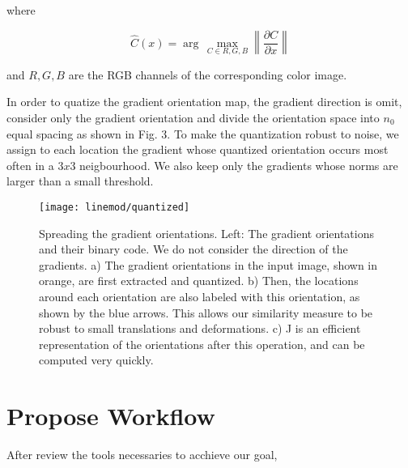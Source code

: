 where

\begin{equation}
\hat{C}(x)=\arg \, \max\limits_{C \in {R,G,B}}\left\|\frac{\partial C}{\partial x}\right\|
\end{equation}

and $R,G,B$ are the RGB channels of the corresponding color image.

In order to quatize the gradient orientation map, the gradient direction is omit,
consider only the gradient orientation and divide the orientation space into $n_0$
equal spacing as shown in Fig. 3. To make the quantization robust to 
noise, we assign to each location the gradient whose quantized orientation occurs most often in a $3 x 3$
neigbourhood. We also keep only the gradients whose norms are larger than a small
threshold.

\begin{figure}[ht]
\centering
\texttt{[image: linemod/quantized]}
\caption{Spreading the gradient orientations. Left: The gradient orientations and their binary code. We do not consider the direction of the gradients. a) The gradient orientations in the input image, shown in orange, are first extracted and quantized. b) Then, the locations around each orientation are also labeled with this orientation, as shown by the blue
arrows. This allows our similarity measure to be robust to small translations and deformations. c) J is an efficient representation of the orientations after this operation, and can be computed very quickly.}
\label{fig:clutter}
\end{figure}

\section{Propose Workflow}
After review the tools necessaries to acchieve our goal, 

